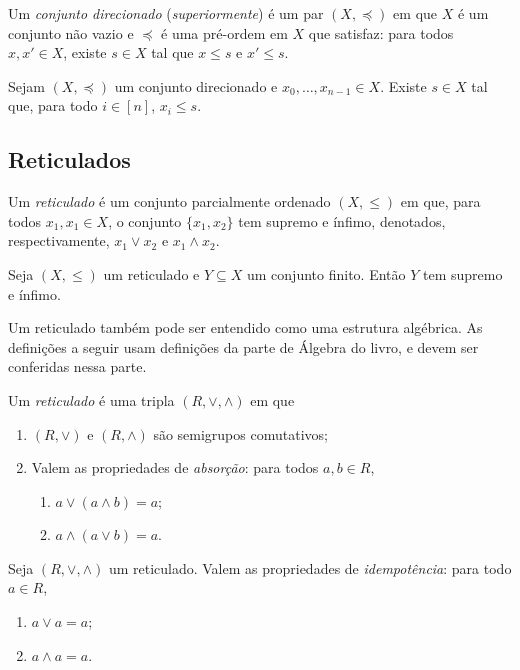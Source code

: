 \begin{definition}
Um \emph{conjunto direcionado} (\emph{superiormente}) é um par $(X,\preceq)$ em que $X$ é um conjunto não vazio e $\preceq$ é uma pré-ordem em $X$ que satisfaz: para todos $x,x' \in X$, existe $s \in X$ tal que $x \leq s$ e $x' \leq s$.
\end{definition}

\begin{exercise}
Sejam $(X,\preceq)$ um conjunto direcionado e $x_0,\ldots,x_{n-1} \in X$. Existe $s \in X$ tal que, para todo $i \in [n]$, $x_i \leq s$.
\end{exercise}

\subsection{Reticulados}

\begin{definition}
	Um \emph{reticulado} é um conjunto parcialmente ordenado $(X,\leq)$ em que, para todos $x_1, x_1 \in X$, o conjunto $\{x_1,x_2\}$ tem supremo e ínfimo, denotados, respectivamente, $x_1 \vee x_2$ e $x_1 \wedge x_2$.
\end{definition}

\begin{proposition}
	Seja $(X,\leq)$ um reticulado e $Y \subseteq X$ um conjunto finito. Então $Y$ tem supremo e ínfimo.
\end{proposition}

Um reticulado também pode ser entendido como uma estrutura algébrica. As definições a seguir usam definições da parte de Álgebra do livro, e devem ser conferidas nessa parte.

\begin{definition}
Um \emph{reticulado} é uma tripla $(R,\vee,\wedge)$ em que
	\begin{enumerate}
	\item $(R,\vee)$ e $(R,\wedge)$ são semigrupos comutativos;
	\item Valem as propriedades de \emph{absorção}: para todos $a,b \in R$, 
		\begin{enumerate}
		\item $a \vee (a \wedge b) = a$;
		\item $a \wedge (a \vee b) = a$.
		\end{enumerate}
	\end{enumerate}
\end{definition}

\begin{proposition}
Seja $(R,\vee,\wedge)$ um reticulado. Valem as propriedades de \emph{idempotência}: para todo $a \in R$,
	\begin{enumerate}
	\item $a \vee a = a$;
	\item $a \wedge a = a$.
	\end{enumerate}
\end{proposition}

